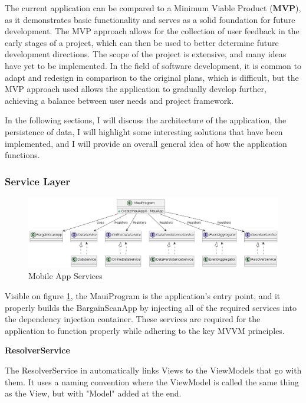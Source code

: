 The current application can be compared to a Minimum Viable Product (\textbf{MVP}), as it demonstrates basic functionality and serves as a solid foundation for future development. The MVP approach allows for the collection of user feedback in the early stages of a project, which can then be used to better determine future development directions. The scope of the project is extensive, and many ideas have yet to be implemented. In the field of software development, it is common to adapt and redesign in comparison to the original plans, which is difficult, but the MVP approach used allows the application to gradually develop further, achieving a balance between user needs and project framework.

In the following sections, I will discuss the architecture of the application, the persistence of data, I will highlight some interesting solutions that have been implemented, and I will provide an overall general idea of how the application functions.

\pagebreak

\subsubsection{Service Layer}

\begin{figure}[H]
	\centering
	\includegraphics[width=1\linewidth]{img/app_services.png}
	\caption{Mobile App Services}
	\label{fig:appservices}
\end{figure}

Visible on figure \ref{fig:appservices}, the MauiProgram is the application's entry point, and it properly builds the BargainScanApp by injecting all of the required services into the dependency injection container. These services are required for the application to function properly while adhering to the key MVVM principles.

\noindent\textbf{ResolverService}

The ResolverService in automatically links Views to the ViewModels that go with them. It uses a naming convention where the ViewModel is called the same thing as the View, but with "Model" added at the end.

